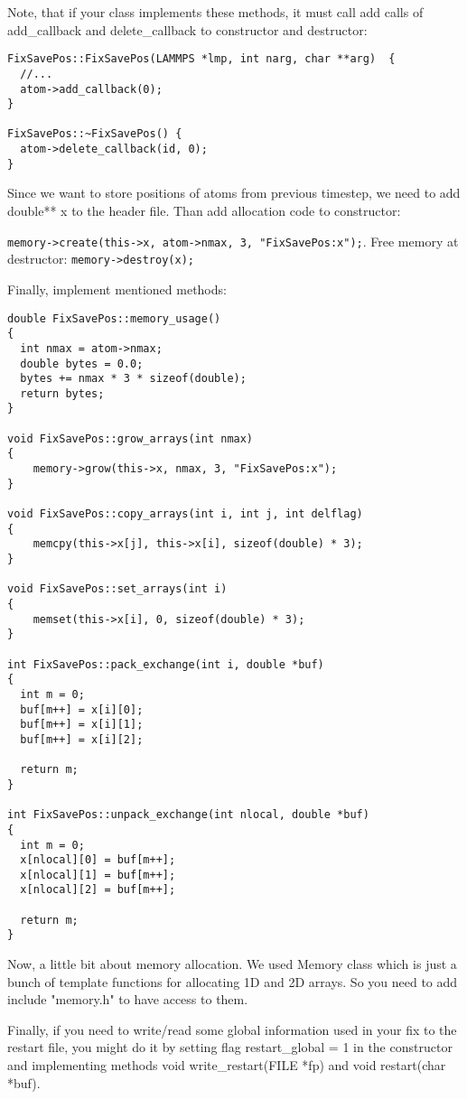 \documentclass{article}
\begin{document}
Note, that if your class implements these methods, it must call add calls of
add\_callback and delete\_callback to constructor and destructor:

\begin{center}
\begin{verbatim}
FixSavePos::FixSavePos(LAMMPS *lmp, int narg, char **arg)  {
  //...
  atom->add_callback(0);
}

FixSavePos::~FixSavePos() {
  atom->delete_callback(id, 0);
}
\end{verbatim}
\end{center}

Since we want to store positions of atoms from previous timestep, we
need to add double** x to the header file. Than add allocation code to
constructor:

\verb|memory->create(this->x, atom->nmax, 3, "FixSavePos:x");|. Free memory
at destructor: \verb|memory->destroy(x);|

Finally, implement mentioned methods:

\begin{center}
\begin{verbatim}
double FixSavePos::memory_usage()
{
  int nmax = atom->nmax;
  double bytes = 0.0;
  bytes += nmax * 3 * sizeof(double);
  return bytes;
}

void FixSavePos::grow_arrays(int nmax)
{
    memory->grow(this->x, nmax, 3, "FixSavePos:x");
}

void FixSavePos::copy_arrays(int i, int j, int delflag)
{
    memcpy(this->x[j], this->x[i], sizeof(double) * 3);
}

void FixSavePos::set_arrays(int i)
{
    memset(this->x[i], 0, sizeof(double) * 3);
}

int FixSavePos::pack_exchange(int i, double *buf)
{
  int m = 0;
  buf[m++] = x[i][0];
  buf[m++] = x[i][1];
  buf[m++] = x[i][2];

  return m;
}

int FixSavePos::unpack_exchange(int nlocal, double *buf)
{
  int m = 0;
  x[nlocal][0] = buf[m++];
  x[nlocal][1] = buf[m++];
  x[nlocal][2] = buf[m++];

  return m;
}
\end{verbatim}
\end{center}

Now, a little bit about memory allocation. We used Memory class which
is just a bunch of template functions for allocating 1D and 2D
arrays. So you need to add include "memory.h" to have access to them.

Finally, if you need to write/read some global information used in
your fix to the restart file, you might do it by setting flag
restart\_global = 1 in the constructor and implementing methods void
write\_restart(FILE *fp) and void restart(char *buf).
\end{document}
